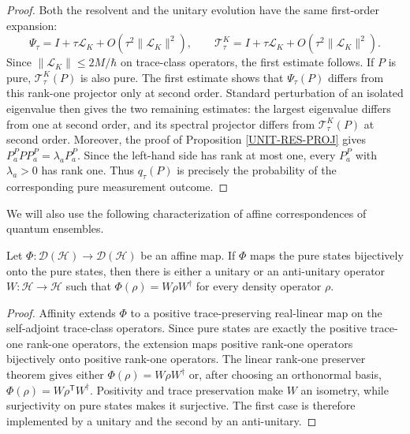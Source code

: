 \documentclass{techbrief}
\begin{document}
\begin{proof}
	Both the resolvent and the unitary evolution have the same first-order expansion:
	\begin{equation}
		\Psi_\tau=I+\tau\mathcal{L}_K+O(\tau^2\|\mathcal{L}_K\|^2),
		\qquad
		\mathcal{T}_\tau^K=I+\tau\mathcal{L}_K+O(\tau^2\|\mathcal{L}_K\|^2).
	\end{equation}
	Since $\|\mathcal{L}_K\|\leq 2M/\hbar$ on trace-class operators, the first estimate follows. If $P$ is pure, $\mathcal{T}_\tau^K(P)$ is also pure. The first estimate shows that $\Psi_\tau(P)$ differs from this rank-one projector only at second order. Standard perturbation of an isolated eigenvalue then gives the two remaining estimates: the largest eigenvalue differs from one at second order, and its spectral projector differs from $\mathcal{T}_\tau^K(P)$ at second order. Moreover, the proof of Proposition \ref{UNIT-RES-PROJ} gives $P_a^P P P_a^P=\lambda_aP_a^P$. Since the left-hand side has rank at most one, every $P_a^P$ with $\lambda_a>0$ has rank one. Thus $q_\tau(P)$ is precisely the probability of the corresponding pure measurement outcome.
\end{proof}

We will also use the following characterization of affine correspondences of quantum ensembles.

\begin{prop}\label{AFF-PURE-PROJ}
	Let $\Phi:\mathcal{D}(\mathcal{H})\to\mathcal{D}(\mathcal{H})$ be an affine map. If $\Phi$ maps the pure states bijectively onto the pure states, then there is either a unitary or an anti-unitary operator $W:\mathcal{H}\to\mathcal{H}$ such that $\Phi(\rho)=W\rho W^\dagger$ for every density operator $\rho$.
\end{prop}

\begin{proof}
	Affinity extends $\Phi$ to a positive trace-preserving real-linear map on the self-adjoint trace-class operators. Since pure states are exactly the positive trace-one rank-one operators, the extension maps positive rank-one operators bijectively onto positive rank-one operators. The linear rank-one preserver theorem gives either $\Phi(\rho)=W\rho W^\dagger$ or, after choosing an orthonormal basis, $\Phi(\rho)=W\rho^{\mathsf T}W^\dagger$. Positivity and trace preservation make $W$ an isometry, while surjectivity on pure states makes it surjective. The first case is therefore implemented by a unitary and the second by an anti-unitary.
\end{proof}
\end{document}
